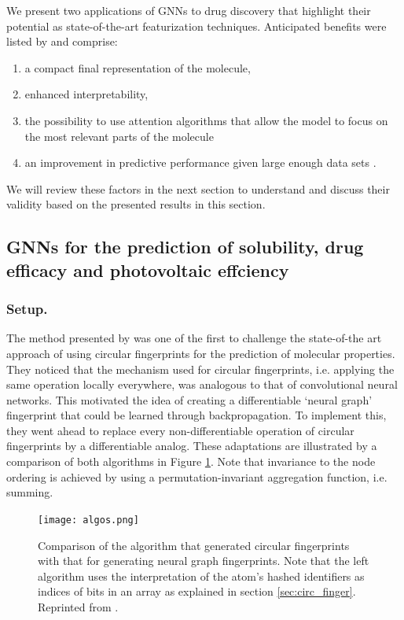 We present two applications of GNNs to drug discovery that highlight their potential as state-of-the-art featurization techniques. Anticipated benefits were listed by \citep{SHEN201929} and comprise:
\begin{enumerate}
	\item a compact final representation of the molecule, 
	\item enhanced interpretability, 
	\item the possibility to use attention algorithms that allow the model to focus on the most relevant parts of the molecule \citep{deepchemstable, graphattentionmpp}
	\item an improvement in predictive performance given large enough data sets \citep{yangMPP}.
\end{enumerate}
We will review these factors in the next section to understand and discuss their validity based on the presented results in this section.

\subsection{GNNs for the prediction of solubility, drug efficacy and photovoltaic effciency}
\label{sec:conv}
\subsubsection*{Setup.}
The method presented by \cite{duvenaud2015convolutional} was one of the first to challenge the state-of-the art approach of using circular fingerprints for the prediction of molecular properties. They noticed that the mechanism used for circular fingerprints, i.e. applying the same operation locally everywhere, was analogous to that of convolutional neural networks. This motivated the idea of creating a differentiable `neural graph' fingerprint that could be learned through backpropagation. To implement this, they went ahead to replace every non-differentiable operation of circular fingerprints by a differentiable analog. These adaptations are illustrated by a comparison of both algorithms in Figure \ref{fig:algos}.
Note that invariance to the node ordering is achieved by using a permutation-invariant aggregation function, i.e. summing.
\begin{figure}[h]
	\centering 
	\texttt{[image: algos.png]}
	\caption{Comparison of the algorithm that generated circular fingerprints  with that for generating neural graph fingerprints. Note that the left algorithm uses the interpretation of the atom's hashed identifiers as indices of bits in an array as explained in section \ref{sec:circ_finger}. Reprinted from \cite{duvenaud2015convolutional}. }
	\label{fig:algos}
\end{figure}

